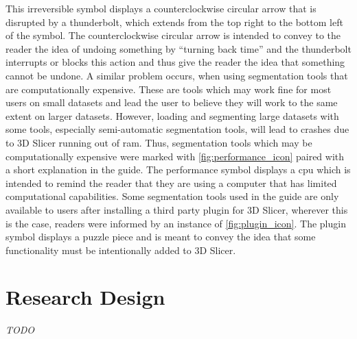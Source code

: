 This irreversible symbol displays a counterclockwise circular arrow that is disrupted by a thunderbolt, which extends from the top right to the bottom left of the symbol.
The counterclockwise circular arrow is intended to convey to the reader the idea of undoing something by ``turning back time'' and the thunderbolt interrupts or blocks this action and thus give the reader the idea that something cannot be undone.
A similar problem occurs, when using segmentation tools that are computationally expensive.
These are tools which may work fine for most users on small datasets and lead the user to believe they will work to the same extent on larger datasets.
However, loading and segmenting large datasets with some tools, especially semi-automatic segmentation tools, will lead to crashes due to 3D Slicer running out of \acrfull{ram}.
Thus, segmentation tools which may be computationally expensive were marked with \cref{fig:performance_icon} paired with a short explanation in the guide.
The performance symbol displays a \acrfull{cpu} which is intended to remind the reader that they are using a computer that has limited computational capabilities.
Some segmentation tools used in the guide are only available to users after installing a third party plugin for 3D Slicer, wherever this is the case, readers were informed by an instance of \cref{fig:plugin_icon}.
The plugin symbol displays a puzzle piece and is meant to convey the idea that some functionality must be intentionally added to 3D Slicer.

\section{Research Design}\label{s:researchDesign}
\textit{TODO}

